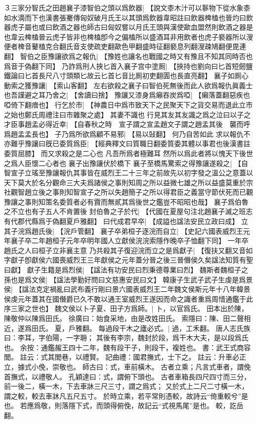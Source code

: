 ３三家分智氏之田趙襄子漆智伯之頭以爲飲器|{
	【說文桼木汁可以鬖物下從水象桼如水滴而下也漢書張騫傳匈奴破月氏王以其頭爲飲器韋昭註曰飲器椑榼也晉灼曰飲器虎子屬也或曰飲酒之器也師古曰匈奴嘗以月氏王頭與漢使歃血盟然則飲酒之器是也韋云椑榼晉云虎子皆非也椑榼卽今之偏榼所以盛酒耳非用飲者也虎子褻器所以溲便者椑音鼙榼克合翻氏音支使疏吏翻歃色甲翻盛時征翻褻息列翻溲疎鳩翻便毘連翻】}
智伯之臣豫讓欲爲之報仇|{
	【豫姓也讓名也戰國之時又有豫且不知其同時否也爲音于偽翻下同】}
乃詐爲刑人挾匕首入襄子宫中塗厠|{
	【挾持也劉向曰匕首短劒鹽鐵論曰匕首長尺八寸頭類匕故云匕首匕音比厠初吏翻圊也長直亮翻】}
襄子如厠心動索之獲豫讓|{
	【索山客翻】}
左右欲殺之襄子曰智伯死無後而此人欲爲報仇眞義士也吾謹避之耳乃舍之|{
	【舍讀曰捨】}
豫讓又漆身爲癩吞炭爲啞|{
	【癩落蓋翻惡疾也啞倚下翻瘖也】}
行乞於市|{
	【神農日中爲市致天下之民聚天下之貨交易而退此立市之始也鄭氏周禮注曰市雜聚之處】}
其妻不識也
行見其友其友識之爲之泣曰以子之才臣事趙孟必得近幸|{
	【自春秋之時　宣子謂之宣孟趙文子謂之趙孟其後　襲而呼爲趙孟孟長也】}
子乃爲所欲爲顧不易邪|{
	【易以䜴翻】}
何乃自苦如此
求以報仇不亦難乎豫讓曰旣已委質爲臣|{
	【經典釋文曰質職日翻委質委其體以事君也後漢書註委質屈膝】}
而又求殺之是二心也
凡吾所爲者極難耳
然所以爲此者將以愧天下後世之爲人臣懷二心者也
襄子出豫讓伏於橋下
襄子至橋馬驚索之得豫讓遂殺之|{
	【自智宣子立瑤至豫讓報仇其事皆在威烈王二十三年之前故先以初字發之溫公之意蓋以天下莫大於名分觀命三大夫爲諸侯之事則知周之所以益微七雄之所以益盛莫重於宗社觀智趙立後之事則知智宣子之所以失趙簡子之所以得君臣之義當守節伏死而已觀豫讓之事則知策名委質者必有霣而無貳其爲後世之鑑豈不昭昭也哉】
	}
襄子爲伯魯之不立也有子五人不肯置後
封伯魯之子於代|{
	【代國在夏屋句注北趙襄子滅之班志有代郡代縣爲于偽翻夏戶雅翻】}
曰代成君早卒|{
	【成謚也諡法安民立政曰成】}
立其子浣爲趙氏後|{
	【浣戶管翻】}
襄子卒弟桓子逐浣而自立|{
	【史記六國表威烈王元年襄子卒二年趙桓子元年卒明年國人立獻侯浣浣索隱作晚卒子恤翻下同】}
一年卒趙氏之人曰桓子立非襄主意
乃共殺其子復迎浣而立之是爲獻子|{
	【復扶又翻又音如字獻子卽獻侯六國喪威烈王三年獻侯之元年蓋分晉之後三晉僭侯久矣諡法知質有聖曰獻】}
獻子生籍是爲烈侯|{
	【諡法有功安民曰烈秉德尊業曰烈】}
魏斯者魏桓子之孫也是爲文侯|{
	【諡法學勤好問曰文慈惠安民曰文】}
韓康子生武子武子生虔是爲景侯|{
	【諡法克定禍亂曰武布義行剛曰景六國表威烈王二年魏文侯斯元年十八年韓景侯虔元年蓋其在國僭爵已久不敢以通王室威烈王遂因而命之識者重爲周惜通鑑于此序三家之世也】}
魏文侯以卜子夏、田子方爲師。|{
	卜，以官爲氏。
	田本出於陳，陳敬仲以陳爲田氏。
	徐廣曰：始食采地，由是改姓田氏。
	索隱曰：陳、田二聲相近，遂爲田氏。
	夏，戶雅翻。
	}
每過段干木之廬必式。|{
	過，工禾翻。
	唐人志氏族曰：李耳，字伯陽，一字耼；
	其後有李宗，魏封於段，爲干木大夫，是以段爲氏也。
	余按：通鑑赧王四十二年，魏有段干子，則段干，複姓也。
	書：武王式商容閭。
	註云：式其閭巷，以禮賢。
	記曲禮：國君撫式，士下之。
	註云：升車必正立，據式小俛，崇敬也。
	師古曰：式，車前橫木。
	古者立乘；凡言式車者，謂俛首撫式，以禮敬人。
	孔穎達曰：式，謂俯下頭也。
	古者車箱長四尺四寸而三分，前一後二，橫一木，下去車牀三尺三寸，謂之爲式；
	又於式上二尺二寸橫一木，謂之較，較去車牀凡五尺五寸。
	於時立乘，若平常則憑較，故詩云“倚重較兮”是也。
	若應爲敬，則落隱下式，而頭得俯俛，故記云“式視馬尾”是也。
	較，訖岳翻。
	}
